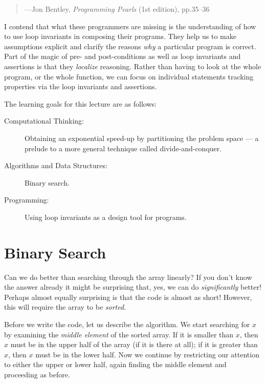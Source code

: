 \begin{preamble}
\begin{quote}
  \hfill ---Jon Bentley, \emph{Programming Pearls} (1st edition), pp.35--36
\end{quote}
I contend that what these programmers are missing is the understanding
of how to use loop invariants in composing their programs.  They help
us to make assumptions explicit and clarify the reasons \emph{why} a
particular program is correct.  Part of the magic of pre- and
post-conditions as well as loop invariants and assertions is that they
\emph{localize} reasoning.  Rather than having to look at the whole
program, or the whole function, we can focus on individual statements
tracking properties via the loop invariants and assertions.
\end{preamble}

\begin{gram}
The learning goals for this lecture are as follows:
\begin{description}
\item[Computational Thinking: ]%
  Obtaining an exponential speed-up by partitioning the problem space --- a
  prelude to a more general technique called divide-and-conquer.
\item[Algorithms and Data Structures: ]%
  Binary search.
\item[Programming: ]%
  Using loop invariants as a design tool for programs.
\end{description}
\end{gram}


\section{Binary Search}
\label{sec:binsearch:theory}

Can we do better than searching through the array linearly?  If you don't know
the answer already it might be surprising that, yes, we can do
\emph{significantly} better!  Perhaps almost equally surprising is that the
code is almost as short!  However, this will require the array to be
\emph{sorted}.

Before we write the code, let us describe the algorithm.  We start
searching for $x$ by examining the \emph{middle element} of the sorted
array.  If it is smaller than $x$, then $x$ must be in the upper half
of the array (if it is there at all); if it is greater than $x$, then
$x$ must be in the lower half.  Now we continue by restricting our
attention to either the upper or lower half, again finding the middle
element and proceeding as before.

